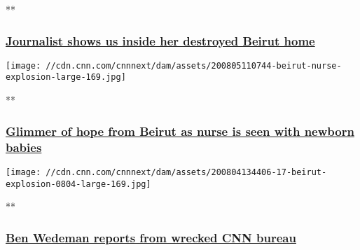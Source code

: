 **

\hypertarget{journalist-shows-us-inside-her-destroyed-beirut-home}{%
\subsubsection{\texorpdfstring{\href{/videos/world/2020/08/05/rima-maktabi-journalist-home-destroyed-beirut-explosion-ctw-vpx.cnn/video/playlists/beirut-explosion/}{Journalist
shows us inside her destroyed Beirut
home}}{Journalist shows us inside her destroyed Beirut home}}\label{journalist-shows-us-inside-her-destroyed-beirut-home}}

\href{/videos/world/2020/08/05/lebanon-beirut-explosion-blast-nurse-three-babies-picture-ctw-intl-ldn-vpx.cnn/video/playlists/beirut-explosion/}{}

\texttt{[image: //cdn.cnn.com/cnnnext/dam/assets/200805110744-beirut-nurse-explosion-large-169.jpg]}

**

\hypertarget{glimmer-of-hope-from-beirut-as-nurse-is-seen-with-newborn-babies-}{%
\subsubsection{\texorpdfstring{\href{/videos/world/2020/08/05/lebanon-beirut-explosion-blast-nurse-three-babies-picture-ctw-intl-ldn-vpx.cnn/video/playlists/beirut-explosion/}{Glimmer
of hope from Beirut as nurse is seen with newborn babies
}}{Glimmer of hope from Beirut as nurse is seen with newborn babies }}\label{glimmer-of-hope-from-beirut-as-nurse-is-seen-with-newborn-babies-}}

\href{/videos/world/2020/08/04/beirut-lebanon-explosion-ben-wedeman-live-amanpour-vpx.cnn/video/playlists/beirut-explosion/}{}

\texttt{[image: //cdn.cnn.com/cnnnext/dam/assets/200804134406-17-beirut-explosion-0804-large-169.jpg]}

**

\hypertarget{ben-wedeman-reports-from-wrecked-cnn-bureau}{%
\subsubsection{\texorpdfstring{\href{/videos/world/2020/08/04/beirut-lebanon-explosion-ben-wedeman-live-amanpour-vpx.cnn/video/playlists/beirut-explosion/}{Ben
Wedeman reports from wrecked CNN
bureau}}{Ben Wedeman reports from wrecked CNN bureau}}\label{ben-wedeman-reports-from-wrecked-cnn-bureau}}

